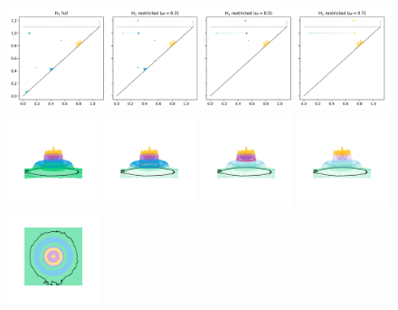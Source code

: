 \begin{figure}[htbp]
  \centering
  \includegraphics[trim=0 0 -10 0, clip, width=\textwidth]{scripts/figures/matching2/dgm-1.png}
  \includegraphics[trim=500 800 500 800, clip, width=0.24\textwidth]{scripts/figures/matching2/surf_side-1.png}
  \includegraphics[trim=500 800 500 800, clip, width=0.24\textwidth]{scripts/figures/matching2/surf_side-1_0.png}
  \includegraphics[trim=500 800 500 800, clip, width=0.24\textwidth]{scripts/figures/matching2/surf_side-1_1.png}
  \includegraphics[trim=500 800 500 800, clip, width=0.24\textwidth]{scripts/figures/matching2/surf_side-1_2.png}
  \includegraphics[trim=500 500 500 500, clip, width=0.24\textwidth]{scripts/figures/matching2/surf_top-1.png}

\end{figure}
